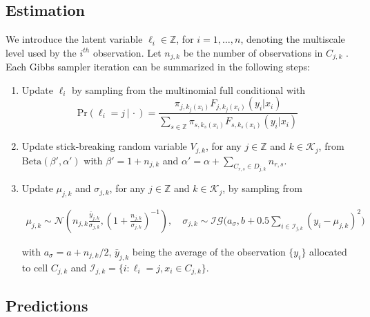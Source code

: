 \documentclass{article} %
\providecommand{\mc}[1]{\mathcal{#1}}
\newcommand{\ZZ}{\mathbb{Z}}
\begin{document}
\subsection{Estimation}



We introduce the latent variable $\ell_i \in \ZZ$, for $i=1,\ldots,n$, denoting the multiscale level used by the $i^{th}$ observation.  
Let $n_{j,k}$ be  the number of observations in $C_{j,k}$ . Each Gibbs sampler iteration can be summarized in the following steps:

\begin{enumerate}
\item Update $\ell_i$ by sampling from the multinomial full conditional with 
\[\mbox{Pr}( \ell_i = j\, |\, \cdot) = \frac{ \pi_{j,k_j(x_i)}F_{j,k_j(x_i)}(y_i|x_i) }{ \sum_{s\in \ZZ} \pi_{s,k_s(x_i)}F_{s,k_s(x_i)}(y_i | x_i) } \label{eq:prS}\]

\item Update stick-breaking random variable $V_{j,k}$, for any $j \in \ZZ$ and $k \in \mc{K}_j$, from $\mbox{Beta}(\beta',\alpha')$ with $\beta'=1+n_{j,k}$ and $\alpha'=\alpha+\sum_{C_{r,s} \in D_{j,k}} n_{r,s}$.

\item Update $\mu_{j,k}$ and $\sigma_{j,k}$, for any $j \in \ZZ$ and $k \in \mc{K}_j$, by sampling from

\begin{align*}
	\mu_{j,k} \sim \mc{N}\left(n_{j,k}\frac{\bar{y}_{j,k}}{ \sigma_{j,k}} , (1+\frac{n_{j,k}}{\sigma_{j,k}})^{-1}\right), \quad
	 \sigma_{j,k} \sim \mc{IG}\bigg(a_{\sigma},b+0.5\sum_{i \in \mc{I}_{j,k}} \left(y_{i}-\mu_{j,k}\right)^2\bigg)	
\end{align*}

with $a_{\sigma}=a+n_{j,k}/2$, $\bar{y}_{j,k}$ being the average of the observation $\{y_i\}$ allocated to cell $C_{j,k}$ and $\mc{I}_{j,k}=\{i : \ell_i=j, x_i \in C_{j,k}\}$.

\end{enumerate}



\subsection{Predictions}\label{ch3:predictions}
\end{document}
